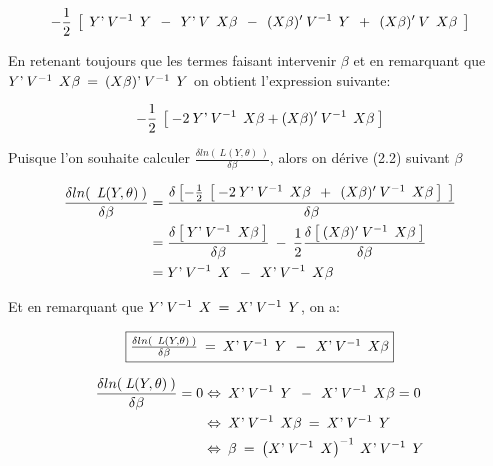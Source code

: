 \documentclass[11pt,fleqn]{book} %
\begin{document}
$$ -\frac{1}{2} \:\left[\:\: Y\textnormal{'}\:V^{-1}\:\: Y \:\:-\:\: Y\textnormal{'} \:V\:\: X\beta \:\:-\:\: (X\beta)'\:V^{-1}\:\: Y \:\:+\:\: (X\beta)' \:V\:\: X\beta \:\:\right]$$ 

\vspace{1em}

En retenant toujours que les termes faisant intervenir $\beta$ et en remarquant que\\ $Y\textnormal{'}\: V^{-1}\:\:X\beta \:=\: (X\beta)\textnormal{'}\:V^{-1}\:\: Y$ on obtient l'expression suivante:

\begin{equation}
-\frac{1}{2}  \:\left[\: -2\: Y\textnormal{'} \:V^{-1}\:\: X\beta + (X\beta)' \:V^{-1}\:\: X\beta \:\right]
\end{equation}

\vspace{1em}

Puisque l'on souhaite calculer $\frac{\delta ln(\:\textit{L}(Y,\theta)\:)}{\delta\beta}$, alors on dérive (2.2) suivant $\beta$

\begin{align*}
\frac{\delta ln(\:\:\textit{L}(Y,\theta)\:)}{\delta\beta} &= \frac{\delta \left[ -\frac{1}{2} \:\left[\: -2\: Y\textnormal{'} \:V^{-1}\:\: X\beta \:\:+\:\: (X\beta)' \:V^{-1}\:\: X\beta \:\right] \:\: \right] }{\delta\beta} \\
&=  \frac{  \delta \left[\:  Y\textnormal{'} \:V^{-1}\:\: X\beta \:\right] }{\delta\beta} \:-\: \frac{1}{2}  \frac{\delta \left[\:  (X\beta)' \:V^{-1} \:\: X\beta \:\right] }{\delta\beta}\\
&= Y\textnormal{'} \:V^{-1}\:\: X \:\:-\:\: X\textnormal{'} \:V^{-1}\:\: X\beta
\end{align*}

\vspace{1em}

Et en remarquant que \quad $Y\textnormal{'} \:V^{-1}\:\: X\:=\:X\textnormal{'} \:V^{-1}\:\: Y$, on a:

\begin{equation}
 \fbox{$
\frac{\delta ln(\:\:\textit{L}(Y,\theta)\:)}{\delta\beta} \:=\: X\textnormal{'} \:V^{-1}\:\: Y \:\:-\:\: X\textnormal{'} \:V^{-1}\:\: X\beta
$}
\end{equation}

\vspace{1em}

\begin{align*}
\frac{\delta ln(\:\textit{L}(Y,\theta)\:)}{\delta\beta}=0 &\Leftrightarrow \: X\textnormal{'} \:V^{-1}\:\: Y \:\:-\:\:  X\textnormal{'} \:V^{-1}\:\: X\beta = 0 \\
& \Leftrightarrow \:   X\textnormal{'} \:V^{-1}\:\: X\beta \:=\:  X\textnormal{'} \:V^{-1}\:\: Y\\
& \Leftrightarrow \: \beta \: = \: \left(  X\textnormal{'}\:V^{-1}\:\: X \right)^{-1}  \: X\textnormal{'} \:V^{-1}\:\: Y
\end{align*}
\end{document}
